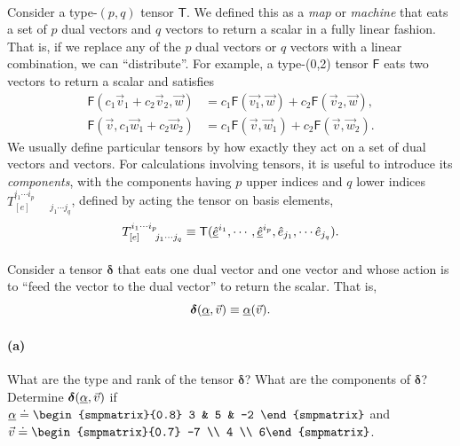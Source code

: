 \documentclass{article}
\newcommand{\basvec}[2]{\hat{#1}_{#2}}							%
\newcommand{\basdual}[2]{\underline{\smash{\hat{#1}}}{}^{#2}}				%
\begin{document}
\paragraph{}
Consider a type-$(p,q)$ tensor $\mathsf{T}$.  We defined this as a \emph{map} or \emph{machine} that eats a set of $p$ dual vectors and $q$ vectors to return a scalar in a fully
linear fashion.  That is, if we replace any of the $p$ dual vectors or $q$ vectors with a linear combination, we can ``distribute''.  
For example, a type-(0,2) tensor $\mathsf{F}$ eats two vectors to return a scalar and satisfies
	\begin{align*}
		\mathsf{F}(c_{1}\vec{v}_{1}+c_{2}\vec{v}_{2}, \vec{w}) &= c_{1}\mathsf{F}(\vec{v_{1}},\vec{w}) + c_{2}\mathsf{F}(\vec{v}_{2},\vec{w}),\\
		\mathsf{F}(\vec{v},c_{1}\vec{w}_{1}+c_{2}\vec{w}_{2}) &= c_{1}\mathsf{F}(\vec{v},\vec{w}_{1}) + c_{2}\mathsf{F}(\vec{v},\vec{w}_{2}).
	\end{align*}
We usually define particular tensors by how exactly they act on a set of dual vectors and vectors.
For calculations involving tensors, it is useful to introduce its \emph{components}, with the components having $p$ upper indices and $q$
lower indices $T^{i_{1}\cdots i_{p}}_{[e]\!\!\!\!\!\! \phantom{i_{1}\cdots i_{p}}j_{1}\cdots j_{q}}$, defined by acting the tensor on basis elements,
	\begin{equation*}
		T^{i_{1}\cdots i_{p}}_{[e]\!\!\!\!\!\! \phantom{i_{1}\cdots i_{p}}j_{1}\cdots j_{q}} \equiv
		\mathsf{T}(\basdual{e}{i_{1}}, \cdots, \basdual{e}{i_{p}}, \basvec{e}{j_{1}}, \cdots \basvec{e}{j_{q}}).
	\end{equation*}

\phline
\paragraph{}
Consider a tensor $\boldsymbol{\delta}$ that eats one dual vector and one vector and whose action is to ``feed the vector to the dual vector'' to return the scalar.  That is,
	\begin{equation*}
		\boldsymbol{\delta}(\underline{\alpha},\vec{v}) \equiv \underline{\alpha}(\vec{v}).
	\end{equation*}

\paragraph{(a)}
What are the type and rank of the tensor $\boldsymbol{\delta}$?  What are the components of $\boldsymbol{\delta}$?  
Determine $\boldsymbol{\delta}(\underline{\alpha},\vec{v})$ if $\dual{\alpha}\doteq \begin{smpmatrix}{0.8} 3 & 5 & -2 \end{smpmatrix}$ 
and $\vec{v} \doteq \begin{smpmatrix}{0.7} -7 \\ 4 \\ 6\end{smpmatrix}$.
\end{document}
